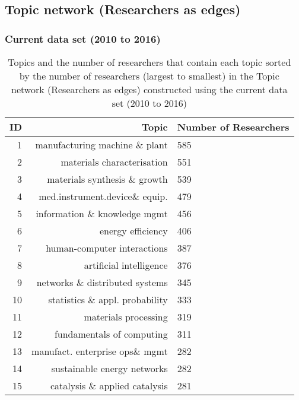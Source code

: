 \clearpage

\subsection{Topic network (Researchers as edges)}

\subsubsection{Current data set (2010 to 2016)}

\begin{spacing}{0.9}
\begin{longtable}[c]{r|r|>{\raggedleft\arraybackslash}m{2.3cm}}
\caption[Topics and the number of researchers that contain each topic in the Topic network (Researchers as edges) constructed using the current data set (2010 to 2016)]{Topics and the number of researchers that contain each topic sorted by the number of researchers (largest to smallest) in the Topic network (Researchers as edges) constructed using the current data set (2010 to 2016)}\\
\label{table:topic_b_current_topics_appendix}
\textbf{ID} & \textbf{Topic} & \textbf{Number of Researchers}\\
\hline
\endhead
{1} & {manufacturing machine \& plant} & {585}\\
{2} & {materials characterisation} & {551}\\
{3} & {materials synthesis \& growth} & {539}\\
{4} & {med.instrument.device\& equip.} & {479}\\
{5} & {information \& knowledge mgmt} & {456}\\
{6} & {energy efficiency} & {406}\\
{7} & {human-computer interactions} & {387}\\
{8} & {artificial intelligence} & {376}\\
{9} & {networks \& distributed systems} & {345}\\
{10} & {statistics \& appl. probability} & {333}\\
{11} & {materials processing} & {319}\\
{12} & {fundamentals of computing} & {311}\\
{13} & {manufact. enterprise ops\& mgmt} & {282}\\
{14} & {sustainable energy networks} & {282}\\
{15} & {catalysis \& applied catalysis} & {281}\\

\end{longtable}
\end{spacing}
